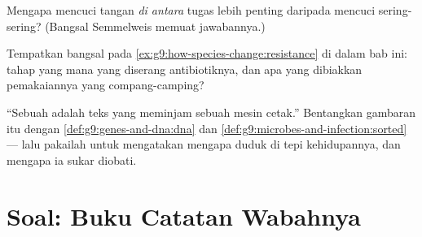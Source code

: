 \begin{exercise}[$\star\star$]\label{exo:g9:microbes-and-infection:10}
Mengapa mencuci tangan \emph{di antara} tugas lebih penting
daripada mencuci sering-sering? (Bangsal Semmelweis memuat
jawabannya.)
\end{exercise}

\begin{exercise}[$\star\star$]\label{exo:g9:microbes-and-infection:11}
Tempatkan bangsal pada
\cref{ex:g9:how-species-change:resistance} di dalam bab ini:
tahap yang mana yang diserang antibiotiknya, dan apa yang
dibiakkan pemakaiannya yang compang-camping?
\end{exercise}

\begin{exercise}[$\star\star\star$]\label{exo:g9:microbes-and-infection:12}
``Sebuah  adalah teks yang meminjam sebuah mesin
cetak.'' Bentangkan gambaran itu dengan
\cref{def:g9:genes-and-dna:dna} dan
\cref{def:g9:microbes-and-infection:sorted} --- lalu pakailah
untuk mengatakan mengapa  duduk di tepi kehidupannya,
dan mengapa ia sukar diobati.
\end{exercise}

\section{Soal: Buku Catatan Wabahnya}

